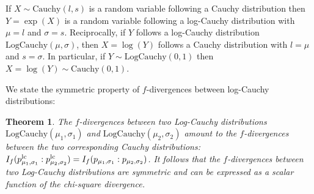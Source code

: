 \documentclass[journal]{IEEEtran}
\newtheorem{theorem}{Theorem}
\begin{document}
If $X\sim\mathrm{Cauchy}(l,s)$ is a random variable following a Cauchy distribution then $Y=\exp(X)$ is a random variable  following a log-Cauchy distribution with $\mu=l$ and $\sigma=s$.
Reciprocally,  if $Y$ follows a log-Cauchy distribution $\mathrm{LogCauchy}(\mu,\sigma)$, then $X=\log(Y)$ follows a Cauchy distribution with $l=\mu$ and $s=\sigma$. 
In particular, if $Y\sim\mathrm{LogCauchy}(0,1)$ then $X=\log(Y)\sim\mathrm{Cauchy}(0,1)$.

We state the symmetric property of $f$-divergences between log-Cauchy distributions:

\begin{theorem}\label{thm:fdivlc}
The $f$-divergences between two Log-Cauchy distributions $\mathrm{LogCauchy}(\mu_1,\sigma_1)$ and $\mathrm{LogCauchy}(\mu_2,\sigma_2)$ amount to the $f$-divergences between the two corresponding Cauchy distributions: 
$I_f(p^{\mathrm{lc}}_{\mu_1,\sigma_1}:p^{\mathrm{lc}}_{\mu_2,\sigma_2})=I_f(p_{\mu_1,\sigma_1}:p_{\mu_2,\sigma_2})$.
It follows that the $f$-divergences between two Log-Cauchy distributions are symmetric and can be expressed as a scalar function of the chi-square divergence.
\end{theorem}
\end{document}
